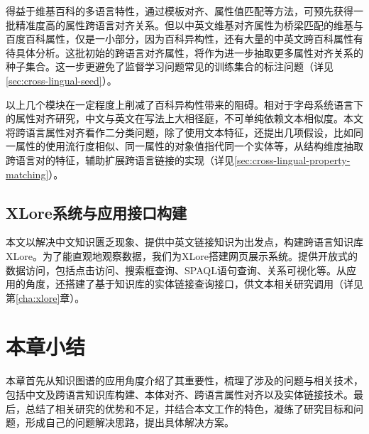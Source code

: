 得益于维基百科的多语言特性，通过模板对齐、属性值匹配等方法，可预先获得一批精准度高的属性跨语言对齐关系。但以中英文维基对齐属性为桥梁匹配的维基与百度百科属性，仅是一小部分，因为百科异构性，还有大量的中英文跨百科属性有待具体分析。这批初始的跨语言对齐属性，将作为进一步抽取更多属性对齐关系的种子集合。这一步更避免了监督学习问题常见的训练集合的标注问题（详见\ref{sec:cross-lingual-seed}）。

以上几个模块在一定程度上削减了百科异构性带来的阻碍。相对于字母系统语言下的属性对齐研究，中文与英文在写法上大相径庭，不可单纯依赖文本相似度。本文将跨语言属性对齐看作二分类问题，除了使用文本特征，还提出几项假设，比如同一属性的使用流行度相似、同一属性的对象值指代同一个实体等，从结构维度抽取跨语言对的特征，辅助扩展跨语言链接的实现（详见\ref{sec:cross-lingual-property-matching}）。

\subsection{XLore系统与应用接口构建}
本文以解决中文知识匮乏现象、提供中英文链接知识为出发点，构建跨语言知识库XLore。为了能直观地观察数据，我们为XLore搭建网页展示系统。提供开放式的数据访问，包括点击访问、搜索框查询、SPAQL语句查询、关系可视化等。从应用的角度，还搭建了基于知识库的实体链接查询接口，供文本相关研究调用（详见第\ref{cha:xlore}章）。

\section{本章小结}
本章首先从知识图谱的应用角度介绍了其重要性，梳理了涉及的问题与相关技术，包括中文及跨语言知识库构建、本体对齐、跨语言属性对齐以及实体链接技术。最后，总结了相关研究的优势和不足，并结合本文工作的特色，凝练了研究目标和问题，形成自己的问题解决思路，提出具体解决方案。